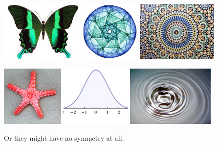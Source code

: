 \begin{center}\label{pics:symm}
\includegraphics[height=3cm]{symm1}
\quad
\includegraphics[height=3cm]{symm2}
\quad
\includegraphics[height=3cm]{symm3}



\includegraphics[height=3cm]{symm4}
\quad
\includegraphics[height=3cm]{symm5}
\quad
\includegraphics[height=3cm]{symm6}
\end{center}

\bigskip

Or they might have no symmetry at all.


